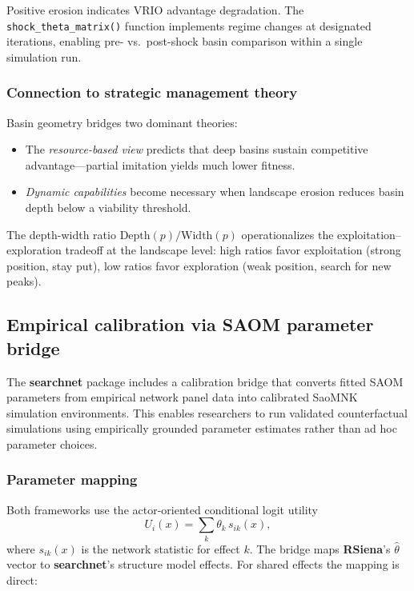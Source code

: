 \documentclass[
]{article}
\begin{document}
\noindent Positive erosion indicates VRIO advantage degradation. The
\texttt{shock\_theta\_matrix()} function implements regime changes at
designated iterations, enabling pre- vs.~post-shock basin comparison
within a single simulation run.

\subsubsection{Connection to strategic management
theory}\label{connection-to-strategic-management-theory}

Basin geometry bridges two dominant theories:

\begin{itemize}
\item The \emph{resource-based view} \citep{barney1991firm} predicts that
  deep basins sustain competitive advantage---partial imitation yields much
  lower fitness.
\item \emph{Dynamic capabilities} \citep{teece1997dynamic} become necessary
  when landscape erosion reduces basin depth below a viability threshold.
\end{itemize}

\noindent The depth-width ratio \(\text{Depth}(p) / \text{Width}(p)\)
operationalizes the exploitation--exploration tradeoff at the landscape
level: high ratios favor exploitation (strong position, stay put), low
ratios favor exploration (weak position, search for new peaks).

\subsection{Empirical calibration via SAOM parameter
bridge}\label{sec:calibration}

The \textbf{searchnet} package includes a calibration bridge that
converts fitted SAOM parameters from empirical network panel data into
calibrated SaoMNK simulation environments. This enables researchers to
run validated counterfactual simulations using empirically grounded
parameter estimates rather than ad hoc parameter choices.

\subsubsection{Parameter mapping}\label{parameter-mapping}

Both frameworks use the actor-oriented conditional logit utility
\begin{equation}\label{eq:calibration-utility}
  U_i(x) = \sum_k \theta_k \, s_{ik}(x),
\end{equation} where \(s_{ik}(x)\) is the network statistic for effect
\(k\). The bridge maps \textbf{RSiena}'s \(\hat{\theta}\) vector to
\textbf{searchnet}'s structure model effects. For shared effects the
mapping is direct:
\end{document}
